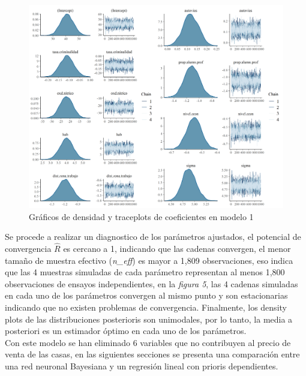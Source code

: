 \documentclass[nojss]{jss}
\begin{document}
\begin{figure}[H]
	\centering
	\includegraphics[scale=0.8]{images/traceplot1}
	\caption[trace1]{Gráficos de densidad y traceplots de coeficientes en modelo 1}
	\label{fig:fig5}
\end{figure}

Se procede a realizar un diagnostico de los parámetros ajustados, el potencial de convergencia $\widehat{R}$ es cercano a 1, indicando que las cadenas convergen,  el menor tamaño de muestra efectivo (\textit{n\_eff}) es mayor a 1,809 observaciones, eso indica que las 4 muestras simuladas de cada parámetro representan al menos 1,800 observaciones de ensayos independientes, en la \textit{figura 5}, las 4 cadenas simuladas en cada uno de los parámetros convergen al mismo punto y son estacionarias indicando que no existen problemas de convergencia. Finalmente, los density plots de las distribuciones posterioris son unimodales, por lo tanto, la media a posteriori es un estimador óptimo en cada uno de los parámetros.\\

Con este modelo se han eliminado 6 variables que no contribuyen al precio de venta de las casas, en las siguientes secciones se presenta una comparación entre una red neuronal Bayesiana y un regresión lineal con prioris dependientes.\\
\end{document}
